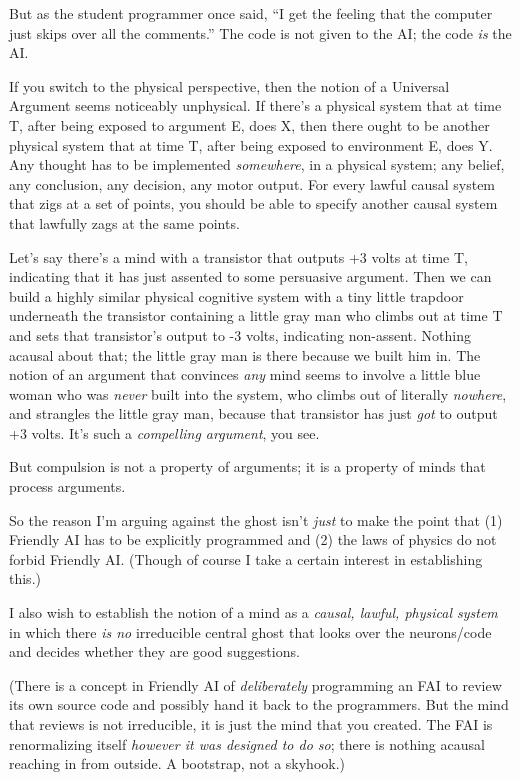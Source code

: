 {
 But as the student programmer once said, ``I get
the feeling that the computer just skips over all the
comments.'' The code is not given to the AI; the code
\textit{is} the AI.}

{
 If you switch to the physical perspective, then the notion of a
Universal Argument seems noticeably unphysical. If
there's a physical system that at time T, after being
exposed to argument E, does X, then there ought to be another physical
system that at time T, after being exposed to environment E, does Y.
Any thought has to be implemented \textit{somewhere}, in a physical
system; any belief, any conclusion, any decision, any motor output. For
every lawful causal system that zigs at a set of points, you should be
able to specify another causal system that lawfully zags at the same
points.}

{
 Let's say there's a mind with a
transistor that outputs +3 volts at time T, indicating that it has just
assented to some persuasive argument. Then we can build a highly
similar physical cognitive system with a tiny little trapdoor
underneath the transistor containing a little gray man who climbs out
at time T and sets that transistor's output to -3
volts, indicating non-assent. Nothing acausal about that; the little
gray man is there because we built him in. The notion of an argument
that convinces \textit{any} mind seems to involve a little blue woman
who was \textit{never} built into the system, who climbs out of
literally \textit{nowhere}, and strangles the little gray man, because
that transistor has just \textit{got} to output +3 volts.
It's such a \textit{compelling argument}, you see.}

{
 But compulsion is not a property of arguments; it is a property of
minds that process arguments.}

{
 So the reason I'm arguing against the ghost
isn't \textit{just} to make the point that (1) Friendly
AI has to be explicitly programmed and (2) the laws of physics do not
forbid Friendly AI. (Though of course I take a certain interest in
establishing this.)}

{
 I also wish to establish the notion of a mind as a \textit{causal,
lawful, physical system} in which there \textit{is no} irreducible
central ghost that looks over the neurons/code and decides whether they
are good suggestions.}

{
 (There is a concept in Friendly AI of \textit{deliberately}
programming an FAI to review its own source code and possibly hand it
back to the programmers. But the mind that reviews is not irreducible,
it is just the mind that you created. The FAI is renormalizing itself
\textit{however it was designed to do so}; there is nothing acausal
reaching in from outside. A bootstrap, not a skyhook.)}

